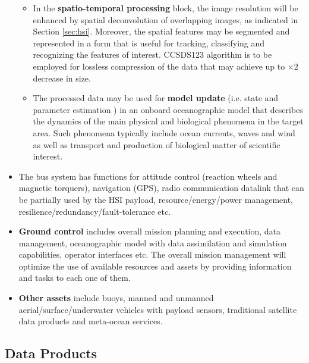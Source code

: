 \begin{itemize}
\begin{itemize}
  \item In the {\bf spatio-temporal processing} block, the image
    resolution will be enhanced by spatial deconvolution of
    overlapping images, as indicated in Section
    \ref{sec:hsi}. Moreover, the spatial features may be segmented and
    represented in a form that is useful for tracking, classifying and
    recognizing the features of interest. CCSDS123 algorithm is to be 
		employed for lossless compression of the data that may achieve up to 
		$\times 2$ decrease in size. 

  \item The processed data may be used for {\bf model update} (i.e.
    state and parameter estimation ) in an onboard oceanographic model
    that describes the dynamics of the main physical and biological
    phenomena in the target area. Such phenomena typically include
    ocean currents, waves and wind as well as transport and production
    of biological matter of scientific interest. 
\end{itemize} 

\item The {\bf \hypso} bus system has functions for attitude control
  (reaction wheels and magnetic torquers), navigation (GPS), radio
  communication datalink that can be partially used by the HSI payload,
  resource/energy/power management, resilience/redundancy/fault-tolerance etc.

\item {\bf Ground control} includes overall mission planning and
  execution, data management, oceanographic model with data
  assimilation and simulation capabilities, operator interfaces etc. 
	The overall mission management will optimize the use of
  available resources and assets by providing information and tasks to
  each one of them.

\item {\bf Other assets} include buoys, manned and unmanned
  aerial/surface/underwater vehicles with payload sensors, traditional
  satellite data products and meta-ocean services.

\end{itemize}

\subsection{Data Products} \label{sec:data_products}

